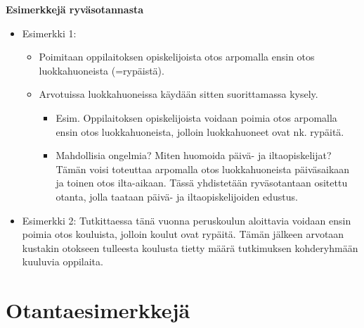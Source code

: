 \documentclass[
]{book}
\providecommand{\tightlist}{%
  \setlength{\itemsep}{0pt}\setlength{\parskip}{0pt}}
\begin{document}
\begin{eblock}{}

\textbf{Esimerkkejä ryväsotannasta}

\begin{itemize}
\tightlist
\item
  Esimerkki 1:

  \begin{itemize}
  \tightlist
  \item
    Poimitaan oppilaitoksen opiskelijoista otos arpomalla ensin otos luokkahuoneista (=rypäistä).
  \item
    Arvotuissa luokkahuoneissa käydään sitten suorittamassa kysely.

    \begin{itemize}
    \tightlist
    \item
      Esim. Oppilaitoksen opiskelijoista voidaan poimia otos arpomalla ensin otos luokkahuoneista, jolloin luokkahuoneet ovat nk. rypäitä.
    \item
      Mahdollisia ongelmia? Miten huomoida päivä- ja iltaopiskelijat? Tämän voisi toteuttaa arpomalla otos luokkahuoneista päiväsaikaan ja toinen otos ilta-aikaan. Tässä yhdistetään ryväsotantaan ositettu otanta, jolla taataan päivä- ja iltaopiskelijoiden edustus.
    \end{itemize}
  \end{itemize}
\item
  Esimerkki 2: Tutkittaessa tänä vuonna peruskoulun aloittavia voidaan ensin poimia otos kouluista, jolloin koulut ovat rypäitä. Tämän jälkeen arvotaan kustakin otokseen tulleesta koulusta tietty määrä tutkimuksen kohderyhmään kuuluvia oppilaita.
\end{itemize}

\end{eblock}

\hypertarget{alaluku82}{%
\section{Otantaesimerkkejä}\label{alaluku82}}
\end{document}
